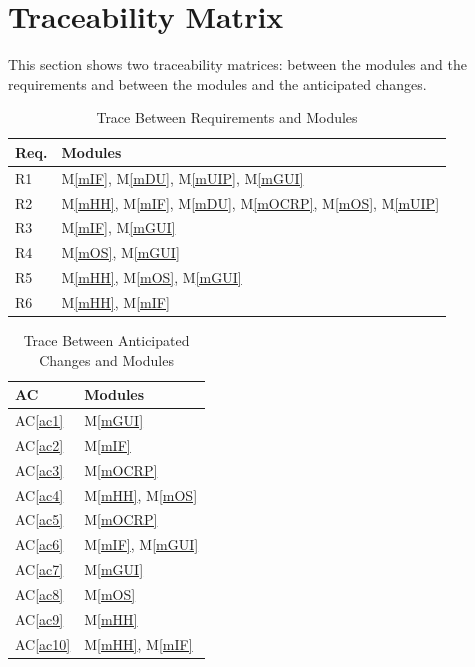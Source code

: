 \documentclass[12pt, titlepage]{article}
\newcommand{\acref}[1]{AC\ref{#1}}
\newcommand{\mref}[1]{M\ref{#1}}
\begin{document}
\section{Traceability Matrix} \label{SecTM}

This section shows two traceability matrices: between the modules and the
requirements and between the modules and the anticipated changes.

\begin{table}[H]
\centering
\begin{tabular}{p{} p{}}
\toprule
\textbf{Req.} & \textbf{Modules}\\
\midrule
R1 & \mref{mIF}, \mref{mDU}, \mref{mUIP}, \mref{mGUI}\\
R2 & \mref{mHH}, \mref{mIF}, \mref{mDU}, \mref{mOCRP}, \mref{mOS}, \mref{mUIP}\\
R3 & \mref{mIF}, \mref{mGUI}\\
R4 & \mref{mOS}, \mref{mGUI}\\
R5 & \mref{mHH}, \mref{mOS}, \mref{mGUI}\\
R6 & \mref{mHH}, \mref{mIF}\\

\bottomrule
\end{tabular}
\caption{Trace Between Requirements and Modules}
\label{TblRT}
\end{table}

\begin{table}[H]
\centering
\begin{tabular}{p{} p{}}
\toprule
\textbf{AC} & \textbf{Modules}\\
\midrule
\acref{ac1} & \mref{mGUI}\\
\acref{ac2} & \mref{mIF}\\
\acref{ac3} & \mref{mOCRP}\\
\acref{ac4} & \mref{mHH}, \mref{mOS}\\
\acref{ac5} & \mref{mOCRP}\\
\acref{ac6} & \mref{mIF}, \mref{mGUI}\\
\acref{ac7} & \mref{mGUI}\\
\acref{ac8} & \mref{mOS}\\
\acref{ac9} & \mref{mHH}\\
\acref{ac10} & \mref{mHH}, \mref{mIF}\\
\bottomrule
\end{tabular}
\caption{Trace Between Anticipated Changes and Modules}
\label{TblACT}
\end{table}
\end{document}
